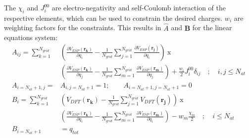 The $\chi_i$ and $J_i^{00}$ are electro-negativity and self-Coulomb interaction of the respective elements, which can be used to 
constrain the desired charges. $w_i$ are weighting factors for the constraints. This results in $\hat{A}$ and $\mathbf{B}$ for the 
linear equations system:
\begin{align}
 A_{ij}=\sum_{k=1}^{N_{grid}}&\left(\frac{\partial V_{ESP}(\mathbf{r_k})}{\partial q_i}-\frac{1}{N_{grid}}\sum_{j=1}^{N_{grid}}\frac{\partial V_{ESP}(\mathbf{r_j})}{\partial q_i}\right)~\mathrm{x}\\\nonumber
                             & \left(\frac{\partial V_{ESP}(\mathbf{r_k})}{\partial q_j}-\frac{1}{N_{grid}}\sum_{m=1}^{N_{grid}}\frac{\partial V_{ESP}(\mathbf{r_m})}{\partial q_j}\right)+\frac{w_i}{2}J_i^{00}\delta_{ij} \quad\mathrm{;}\quad i,j\leq N_{at}\\\nonumber
A_{i=N_{at}+1,j}=&A_{i,j=N_{at}+1}=1;\qquad A_{i=N_{at}+1,j=N_{at}+1}=0\\\nonumber
 B_{i}=\sum_{k=1}^{N_{grid}}&\left(V_{DFT}(\mathbf{r_k})-\frac{1}{N_{grid}}\sum_{j=1}^{N_{grid}}V_{DFT}(\mathbf{r_j})\right)~\mathrm{x}\\\nonumber
                             & \left(\frac{\partial V_{ESP}(\mathbf{r_k})}{\partial q_i}-\frac{1}{N_{grid}}\sum_{m=1}^{N_{grid}}\frac{\partial V_{ESP}(\mathbf{r_m})}{\partial q_i}\right)-w_m\frac{\chi_m}{2} \quad \mathrm{;} \quad i\leq N_{at}\\\nonumber
B_{i=N_{at}+1}&=q_{tot}\\\nonumber
\end{align}

